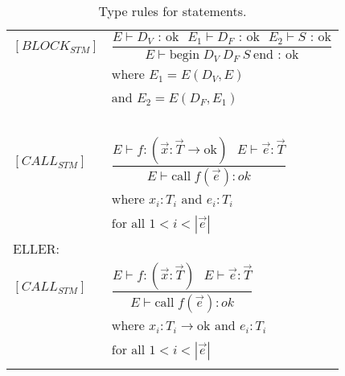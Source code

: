\begin{longtable}{l l}
$[BLOCK_{STM}]$ & $\dfrac{E\vdash D_V \text{ : ok} \:\:\: E_1\vdash D_F \text{ : ok}\:\:\: E_2\vdash S \text{ : ok}}{E\vdash \text{begin}\; D_V \: D_F \: S \: \text{end : ok}}$ \\
~& $\text{where }E_1=E(D_V,E)$\\
~& $\text{and }E_2=E(D_F,E_1)$\\
~&~\\
$[CALL_{STM}]$ & $\dfrac{E\vdash f:(\vec{x}:\vec{T}\rightarrow\text{ok})\:\:\:E\vdash \vec{e}:\vec{T}}{E\vdash \text{call}\;f(\vec{e}):ok}$\\
~& $\text{where }x_i:T_i \text{ and } e_i:T_i$\\
~& $\text{for all }1 < i < |\vec{e}|$\\

ELLER:&~\\
$[CALL_{STM}]$ & $\dfrac{E\vdash f:(\vec{x}:\vec{T})\:\:\:E\vdash \vec{e}:\vec{T}}{E\vdash \text{call}\;f(\vec{e}):ok}$\\
~& $\text{where }x_i:T_i \rightarrow\text{ok} \text{ and } e_i:T_i$\\
~& $\text{for all }1 < i < |\vec{e}|$\\
\caption{Type rules for statements.}
\label{tab:statements}
\end{longtable}